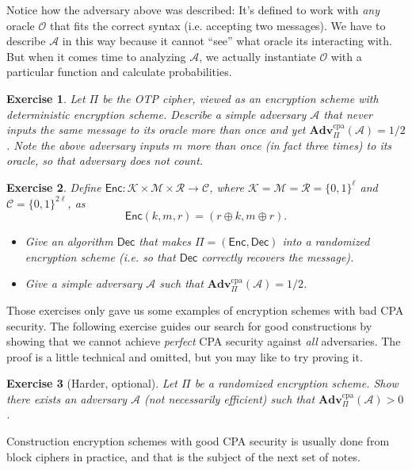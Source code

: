 \documentclass[11pt]{article}
\newtheorem{exercise}{Exercise}
\newcommand{\msgs}{\mathcal{M}}
\newcommand{\ctxts}{\mathcal{C}}
\newcommand{\keys}{\mathcal{K}}
\newcommand{\rands}{\mathcal{R}}
\newcommand{\Enc}{\mathsf{Enc}}
\newcommand{\Dec}{\mathsf{Dec}}
\newcommand{\calA}{\mathcal{A}}
\newcommand{\calO}{\mathcal{O}}
\newcommand{\Adv}{\mathbf{Adv}}
\newcommand{\AdvCPA}[2]{\Adv^{\mathrm{cpa}}_{#1}({#2})}
\newcommand{\bits}{\{0,1\}}
\begin{document}
Notice how the adversary above was described: It's defined to work with
\emph{any} oracle $\calO$ that fits the correct syntax (i.e. accepting two
messages). We have to describe $\calA$ in this way because it cannot ``see''
what oracle its interacting with. But when it comes time to analyzing $\calA$,
we actually instantiate $\calO$ with a particular function and calculate
probabilities.

\begin{exercise}
    Let $\Pi$ be the OTP cipher, viewed as an encryption scheme with
    deterministic encryption scheme. Describe a simple adversary $\calA$
    that never inputs the same message to its oracle more than once and yet
    $\AdvCPA{\Pi}{\calA} = 1/2$. Note the above adversary inputs $m$
    more than once (in fact three times) to its oracle, so that adversary
    does not count.
\end{exercise}

\begin{exercise}
    Define $\Enc:\keys\times\msgs\times\rands\to\ctxts$, where 
    $\keys=\msgs=\rands=\bits^\ell$ and $\ctxts = \bits^{2\ell}$, 
    as
    \[
        \Enc(k,m,r) = (r\oplus k, m\oplus r).
    \]
    \begin{itemize}

        \item Give an algorithm $\Dec$ that makes $\Pi = (\Enc,\Dec)$ into a
            randomized encryption scheme (i.e. so that $\Dec$ correctly
            recovers the message).

        \item Give a simple adversary $\calA$ such that $\AdvCPA{\Pi}{\calA} =
            1/2$.

    \end{itemize}

\end{exercise}

Those exercises only gave us some examples of encryption schemes with bad
CPA security.   The following exercise guides our search for good constructions
by showing that we cannot achieve \emph{perfect} CPA security against
\emph{all} adversaries.  The proof is a little technical and omitted, but you
may like to try proving it.
\begin{exercise}[Harder, optional]
    Let $\Pi$ be a randomized encryption scheme.  Show there exists an
    adversary $\calA$ (not necessarily efficient)
    such that $\AdvCPA{\Pi}{\calA} > 0$.
\end{exercise}
Construction encryption schemes with good CPA security is
usually done from block ciphers in practice, and that is the subject
of the next set of notes. 
\end{document}
